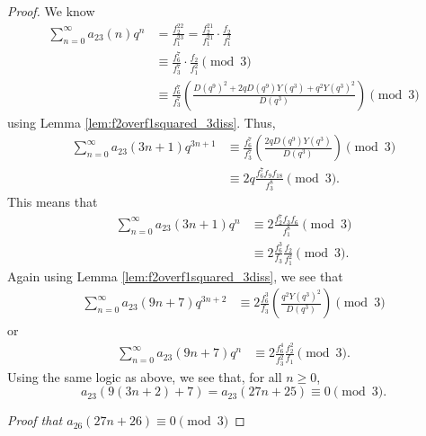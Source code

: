 \documentclass[10pt, reqno]{amsart}
\theoremstyle{theorem}
\theoremstyle{definition}
\theoremstyle{example}
\begin{document}
\begin{proof}
\noindent 
We know 
\begin{align*}
\sum_{n=0}^\infty a_{23}(n)q^n 
&= 
\frac{f_2^{22}}{f_1^{23}} = 
\frac{f_2^{21}}{f_1^{21}}\cdot \frac{f_2}{f_1^2} \\
&\equiv 
\frac{f_{6}^7}{f_3^7}\cdot \frac{f_2}{f_1^2} \pmod{3}  \\
&\equiv 
\frac{f_6^7}{f_3^7}\left( \frac{D(q^9)^2 +2qD(q^9)Y(q^3)+q^2Y(q^3)^2}{D(q^3)}  \right) \pmod{3} 
\end{align*}
using Lemma \ref{lem:f2overf1squared_3diss}.  
Thus, 
\begin{align*}
\sum_{n=0}^\infty a_{23}(3n+1)q^{3n+1} 
&\equiv 
\frac{f_6^7}{f_3^7}\left( \frac{2qD(q^9)Y(q^3)}{D(q^3)} \right) \pmod{3}  \\
&\equiv 
2q\frac{f_6^7f_{9}f_{18}}{f_3^8} \pmod{3}.
\end{align*}
This means that
\begin{align*}
\sum_{n=0}^\infty a_{23}(3n+1)q^{n} 
&\equiv 
2\frac{f_2^7f_{3}f_{6}}{f_1^8} \pmod{3} \\
&\equiv 
2\frac{f_6^3}{f_3}\frac{f_2}{f_1^2} \pmod{3}.
\end{align*}
Again using Lemma \ref{lem:f2overf1squared_3diss}, we see that 
\begin{align*}
\sum_{n=0}^\infty a_{23}(9n+7)q^{3n+2} 
&\equiv 
2\frac{f_6^3}{f_3} \left( \frac{q^2Y(q^3)^2}{D(q^3)} \right) \pmod{3}
\end{align*}
or 
\begin{align*}
\sum_{n=0}^\infty a_{23}(9n+7)q^{n} 
&\equiv 
2\frac{f_6^4}{f_3^2}\frac{f_2^2}{f_1} \pmod{3}.
\end{align*}
Using the same logic as above, we see that, for all $n\geq 0$, 
\begin{equation*}
a_{23}(9(3n+2)+7) = a_{23}(27n+25) \equiv 0 \pmod{3}. 
\end{equation*}


\bigskip  

\noindent
{\it Proof that $a_{26}(27n+26) \equiv 0 \pmod{3}$}

\bigskip 


\end{proof}
\end{document}
